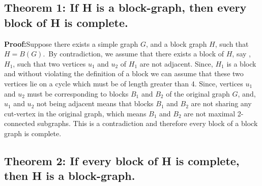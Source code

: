 \documentclass{memoir}
\begin{document}
\subsection{Theorem 1: If H is a block-graph, then every block of H is complete. }
\textbf{Proof:}Suppose there exists a simple graph $G$, and a block graph $H$, such that $H=B(G)$.\ By contradiction, we assume that there exists a block of $H$, say , $H_1$, such that two vertices $u_1$ and $u_2$ of $H_1$ are not adjacent. Since, $H_1$ is a block and without violating the definition of a block we can assume that these two vertices lie on a cycle which must be of length greater than 4. Since, vertices $u_1$ and $u_2$ must be corresponding to blocks $B_1$ and $B_2$ of the original graph $G$, and, $u_1$ and $u_2$ not being adjacent means that blocks $B_1$ and $B_2$ are not sharing any cut-vertex in the original graph, which means $B_1$ and $B_2$ are not maximal 2-connected subgraphs. This is a contradiction and therefore every block of a block graph is complete.

\subsection{Theorem 2: If every block of H is complete, then H is a block-graph.}
\end{document}

